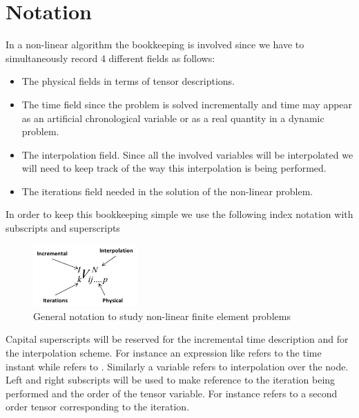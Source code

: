 \section*{Notation}
In a non-linear algorithm the bookkeeping is involved since we have to simultaneously record 4 different fields as follows:
\begin{itemize}
	\item The physical fields in terms of tensor descriptions.
	\item The time field since the problem is solved incrementally 	and time may appear as an artificial chronological variable 	or as a real quantity in a dynamic problem.
	\item The interpolation field.  Since all the involved variables will be interpolated we will need to keep track of the way this interpolation is being performed.
	\item The iterations field needed in the solution of the non-linear problem.
\end{itemize}
In order to keep this bookkeeping simple we use the following index notation with subscripts and superscripts
\begin{figure}[h]
\centering
\includegraphics[width=4cm]{index_notation.pdf}
\caption{General notation to study non-linear finite element problems}
\label{fig:notation}
\end{figure}

Capital superscripts will be reserved for the incremental time description and for the interpolation scheme.  For instance an expression like   refers to the time instant   while   refers to . Similarly a variable   refers to interpolation over the node. Left and right subscripts will be used to make reference to the iteration being performed and the order of the tensor variable.  For instance   refers to a second order tensor corresponding to the iteration.